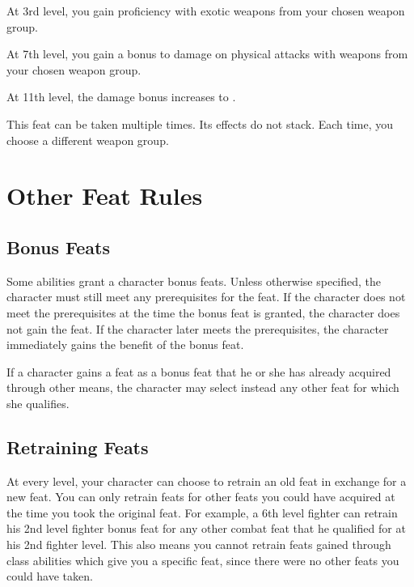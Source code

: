     At 3rd level, you gain proficiency with exotic weapons from your chosen weapon group.

    At 7th level, you gain a  bonus to damage on physical attacks with weapons from your chosen weapon group.

    At 11th level, the damage bonus increases to .

     This feat can be taken multiple times.
    Its effects do not stack.
    Each time, you choose a different weapon group.

\section{Other Feat Rules}

    \subsection{Bonus Feats}
        Some abilities grant a character bonus feats.
        Unless otherwise specified, the character must still meet any prerequisites for the feat.
        If the character does not meet the prerequisites at the time the bonus feat is granted, the character does not gain the feat.
        If the character later meets the prerequisites, the character immediately gains the benefit of the bonus feat.

        If a character gains a feat as a bonus feat that he or she has already acquired through other means, the character may select instead any other feat for which she qualifies.

    \subsection{Retraining Feats}
        At every level, your character can choose to retrain an old feat in exchange for a new feat.
        You can only retrain feats for other feats you could have acquired at the time you took the original feat.
        For example, a 6th level fighter can retrain his 2nd level fighter bonus feat for any other combat feat that he qualified for at his 2nd fighter level.
        This also means you cannot retrain feats gained through class abilities which give you a specific feat, since there were no other feats you could have taken.
